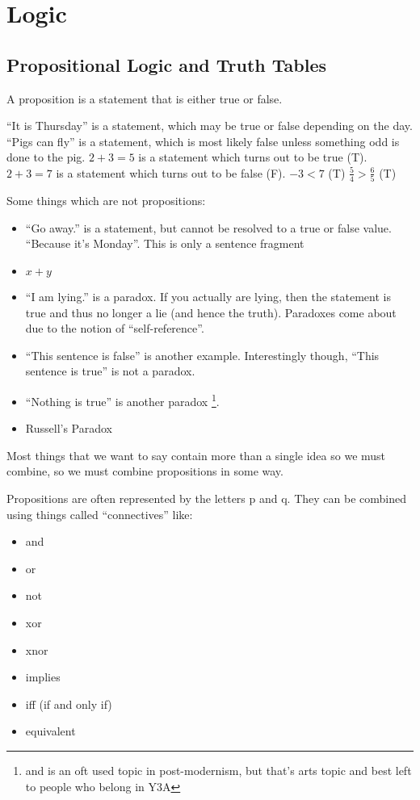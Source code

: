 \chapter{Logic}
\label{chap:Review}

\section{Propositional Logic and Truth Tables}
\label{sec:PropositionalLogicAndTruthTables}

A proposition is a statement that is either true or false.

``It is Thursday'' is a statement, which may be true or false depending on the
day.
``Pigs can fly'' is a statement, which is most likely false unless something odd
is done to the pig.
$2 + 3 = 5$ is a statement which turns out to be true (T).
$2 + 3 = 7$ is a statement which turns out to be false (F).
$ -3 < 7  $ (T)
$\frac{5}{4} > \frac{6}{5}$ (T)

Some things which are not propositions:
\begin{itemize}
  \item ``Go away.'' is a statement, but cannot be resolved to a true or false
  value. ``Because it's Monday''. This is only a sentence fragment 
  \item $ x + y $
  \item ``I am lying.'' is a paradox. If you actually are lying, then the
  statement is true and thus no longer a lie (and hence the truth). Paradoxes come about due to
the notion of ``self-reference''.
  \item ``This sentence is false'' is another example. Interestingly though,
  ``This sentence is true'' is not a paradox.
  \item ``Nothing is true'' is another paradox \footnote{and is an oft used
  topic in post-modernism, but that's arts topic and best left to people who
  belong in Y3A}.
  \item Russell's Paradox
\end{itemize}

Most things that we want to say contain more than a single idea so we must
combine, so we must combine propositions in some way.

Propositions are often represented by the letters p and q. They can be combined
using things called ``connectives'' like:
\begin{itemize}
  \item and
  \item or
  \item not
  \item xor
  \item xnor
  \item implies
  \item iff (if and only if)
  \item equivalent
\end{itemize}


